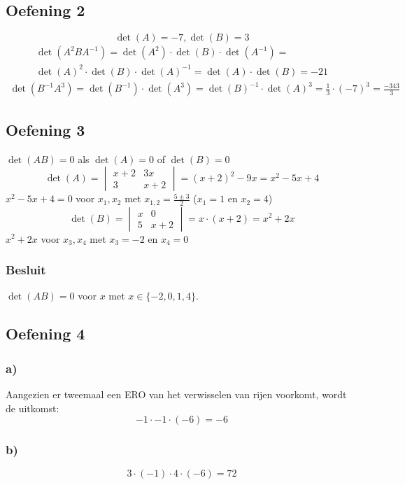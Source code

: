 \documentclass[lineaire_algebra_oplossingen.tex]{subfiles}
\begin{document}
\subsection{Oefening 2}
\[\det(A) = -7, \det(B) = 3\]
\begin{gather*}
    \det(A^2BA^{-1}) =
    \det(A^2) \cdot \det(B) \cdot \det(A^{-1}) =\\
    \det(A)^2 \cdot \det(B) \cdot \det(A)^{-1} = \det(A) \cdot \det(B) = -21
\end{gather*}
\begin{gather*}
    \det(B^{-1}A^3) = \det(B^{-1}) \cdot \det(A^3) = \det(B)^{-1} \cdot \det(A)^3 = \frac{1}{3} \cdot (-7)^3 = \frac{-343}{3}
\end{gather*}

\subsection{Oefening 3}
$\det(AB) = 0$ als $\det(A) = 0$ of $\det(B) = 0$
\\
\[\det(A) = \begin{vmatrix}
x + 2 & 3x\\
3 & x + 2
\end{vmatrix}
 = (x + 2)^2 - 9x = x^2 -5 x + 4
\]
$x^2 -5 x + 4 = 0$ voor $x_1, x_2$ met $x_{1,2} = \frac{5 \pm 3}{2}$ ($x_1 = 1$ en $x_2 = 4$)
\\
\[\det(B) = \begin{vmatrix}
x & 0\\
5 & x + 2
\end{vmatrix}
 = x \cdot (x + 2) = x^2 + 2x\]
$x^2 + 2x$ voor $x_3, x_4$ met $x_3 = -2$ en $x_4 = 0$ 
\subsubsection*{Besluit}
$\det(AB) = 0$ voor $x$ met $x \in \{-2, 0, 1, 4\}$.
\subsection{Oefening 4}
\subsubsection*{a)}
Aangezien er tweemaal een ERO van het verwisselen van rijen voorkomt, wordt de uitkomst:
$$-1\cdot -1\cdot (-6) = -6$$
\subsubsection*{b)}
$$3\cdot(-1)\cdot 4 \cdot (-6) = 72$$
\end{document}
